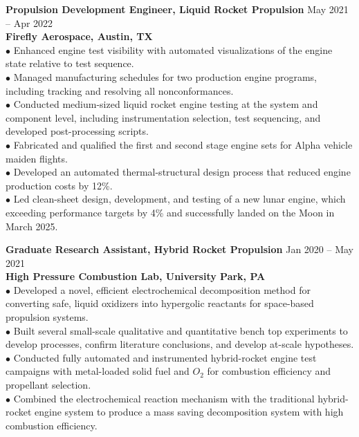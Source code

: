 \documentclass[10pt]{article}
\newcommand{\blankline}{\quad\pagebreak[2]\vspace{-0.3\baselineskip}}
\begin{document}
\blankline

\textbf{Propulsion Development Engineer, Liquid Rocket Propulsion}
\hfill May 2021 -- Apr 2022 \\
\textbf{Firefly Aerospace, Austin, TX} \\
$\bullet$ Enhanced engine test visibility with automated visualizations of the engine state relative to test sequence. \\
$\bullet$ Managed manufacturing schedules for two production engine programs, including tracking and resolving all nonconformances. \\ 
$\bullet$ Conducted medium-sized liquid rocket engine testing at the system and component level, including instrumentation selection, test sequencing, and developed post-processing scripts. \\ 
$\bullet$ Fabricated and qualified the first and second stage engine sets for Alpha vehicle maiden flights. \\
$\bullet$ Developed an automated thermal-structural design process that reduced engine production costs by 12\%. \\
$\bullet$ Led clean-sheet design, development, and testing of a new lunar engine, which exceeding performance targets by 4\% and successfully landed on the Moon in March 2025.

\blankline

\textbf{Graduate Research Assistant, Hybrid Rocket Propulsion}
\hfill Jan 2020 -- May 2021 \\
\textbf{High Pressure Combustion Lab, University Park, PA} \\
$\bullet$ Developed a novel, efficient electrochemical decomposition method for converting safe, liquid oxidizers into hypergolic reactants for space-based propulsion systems. \\ 
$\bullet$ Built several small-scale qualitative and quantitative bench top experiments to develop processes, confirm literature conclusions, and develop at-scale hypotheses. \\
$\bullet$ Conducted fully automated and instrumented hybrid-rocket engine test campaigns with metal-loaded solid fuel and $O_2$ for combustion efficiency and propellant selection. \\ 
$\bullet$ Combined the electrochemical reaction mechanism with the traditional hybrid-rocket engine system to produce a mass saving decomposition system with high combustion efficiency.
\end{document}
